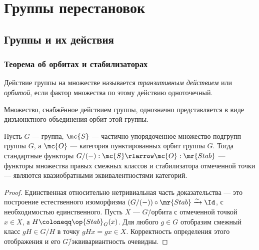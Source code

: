 \documentclass[
	extrafontsizes,
	11pt,
	hyphens,
]{memoir}
\begin{document}
\chapter{Группы перестановок}


\section{Группы и их действия}

\subsection{Теорема об орбитах и стабилизаторах}

\begin{definition}
Действие группы на множестве называется \emph{транзитивным действием} или \emph{орбитой}, если фактор множества по этому действию одноточечный.
\end{definition}

\begin{observation}
Множество, снабжённое действием группы, однозначно представляется в виде дизъюнктного объединения орбит этой группы.
\end{observation}


\begin{theorem}
Пусть \(G\) --- группа, \(\mc{S}\) --- частично упорядоченное множество подгрупп группы \(G\), а \(\mc{O}\) --- категория пунктированных орбит группы \(G\).%
\label{thm:OrbStab}
Тогда стандартные функторы \(G/(-) : \mc{S} \rlarrow \mc{O} : \mr{Stab}\) --- функторы множества правых смежных классов и стабилизатора отмеченной точки --- являются квазиобратными эквивалентностями категорий.
\end{theorem}

\begin{proof}
Единственная относительно нетривиальная часть доказательства --- это построение естественного изоморфизма \((G/(-)) \circ \mr{Stab} \xrightarrow{\sim} \Id\),
с необходимостью единственного.
Пусть \(X\) --- \(G\)\=/орбита с отмеченной точкой \(x \in X\), а \(H \coloneqq \op{Stab}_G(x)\).
Для любого \(g \in G\) отобразим смежный класс \(gH \in G/H\) в точку \(gHx = gx \in X\). Корректность определения этого отображения и его \(G\)\=/эквивариантность очевидны.
\end{proof}
\end{document}
